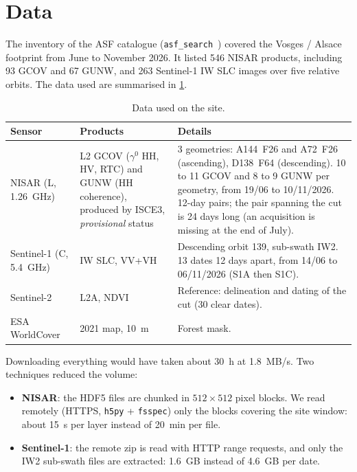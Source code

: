 \documentclass[11pt,a4paper]{article}
\begin{document}
\section{Data}

The inventory of the ASF catalogue (\texttt{asf\_search}~\cite{asfsearch}) covered the Vosges / Alsace footprint
from June to November 2026. It listed 546 NISAR products, including 93 GCOV and 67 GUNW, and 263 Sentinel-1 IW SLC
images over five relative orbits. The data used are summarised in \cref{tab-data}.

\begin{table}[htbp]
\centering\small
\caption{Data used on the site.}
\label{tab-data}
\begin{tabular}{p{2.6cm}p{5.6cm}p{6.6cm}}
\toprule
Sensor & Products & Details \\
\midrule
NISAR (L, 1.26~GHz) & L2 GCOV ($\gamma^0$ HH, HV, RTC) and GUNW (HH coherence), produced by ISCE3,
\emph{provisional} status & 3 geometries: A144~F26 and A72~F26 (ascending), D138~F64 (descending). 10 to 11 GCOV and
8 to 9 GUNW per geometry, from 19/06 to 10/11/2026. 12-day pairs; the pair spanning the cut is 24 days long (an
acquisition is missing at the end of July). \\
Sentinel-1 (C, 5.4~GHz) & IW SLC, VV+VH & Descending orbit 139, sub-swath IW2. 13 dates 12 days apart, from 14/06
to 06/11/2026 (S1A then S1C). \\
Sentinel-2~\cite{drusch2012sentinel2} & L2A, NDVI & Reference: delineation and dating of the cut (30 clear
dates). \\
ESA WorldCover~\cite{zanaga2022worldcover} & 2021 map, 10~m & Forest mask. \\
\bottomrule
\end{tabular}
\end{table}

Downloading everything would have taken about 30~h at 1.8~MB/s. Two techniques reduced the volume:
\begin{itemize}
\item \textbf{NISAR}: the HDF5 files are chunked in $512\times512$ pixel blocks. We read remotely (HTTPS,
  \texttt{h5py} + \texttt{fsspec}) only the blocks covering the site window: about 15~s per layer instead of
  20~min per file.
\item \textbf{Sentinel-1}: the remote zip is read with HTTP range requests, and only the IW2 sub-swath files are
  extracted: 1.6~GB instead of 4.6~GB per date.
\end{itemize}
\end{document}
